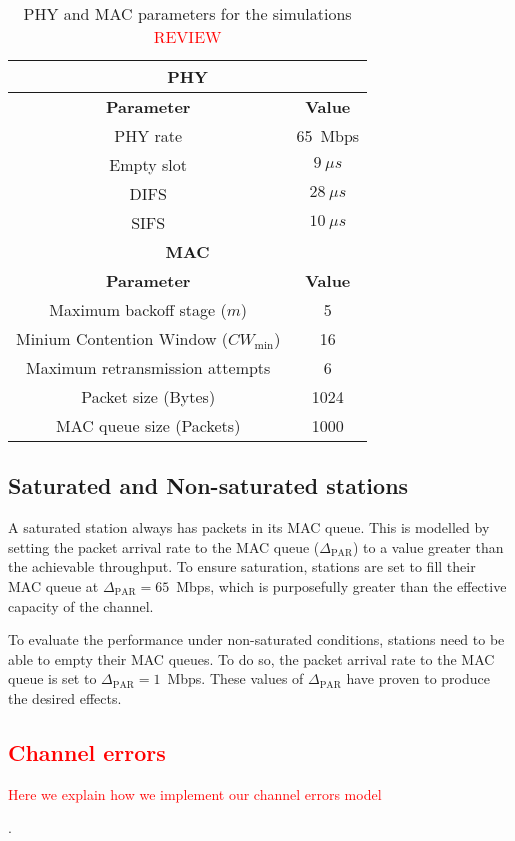 	\begin{table}
		\centering
		\caption{PHY and MAC parameters for the simulations \textcolor{red}{REVIEW}}
		\label{tab:mac-params}
		\begin{tabular}{|c|c|}
			\hline
			\multicolumn{2}{|c|}{{\bfseries PHY}}\\
			\hline
			{\bfseries Parameter} & {\bfseries Value}\\
			\hline
			PHY rate & 65~Mbps\\
			Empty slot & $9~\mu s$\\
			DIFS & $28~\mu s$\\
			SIFS & $10~\mu s$\\
			\hline
			\multicolumn{2}{|c|}{{\bfseries MAC}}\\
			\hline
			{\bfseries Parameter} & {\bfseries Value}\\
			\hline
			Maximum backoff stage ($m$) & 5\\
			Minium Contention Window ($CW_{\min}$) & 16\\
			Maximum retransmission attempts & 6\\
			Packet size (Bytes) & 1024\\
			MAC queue size (Packets) & 1000\\
			\hline
		\end{tabular}
	\end{table}
	
	\subsection{Saturated and Non-saturated stations}\label{unsaturation}
	A saturated station always has packets in its MAC queue. This is modelled by setting the packet arrival rate to the MAC queue ($\Delta_{\text{PAR}}$) to a value greater than the achievable throughput. To ensure saturation, stations are set to fill their MAC queue at $\Delta_{\text{PAR}}=65$~Mbps, which is purposefully greater than the effective capacity of the channel.
	
	To evaluate the performance under non-saturated conditions, stations need to be able to empty their MAC queues. To do so, the packet arrival rate to the MAC queue is set to $\Delta_{\text{PAR}}=1$~Mbps. These values of $\Delta_{\text{PAR}}$ have proven to produce the desired effects.
	
	\textcolor{red}{\subsection{Channel errors} Here we explain how we implement our channel errors model}.
	
